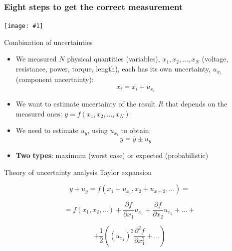 \documentclass[12pt]{beamer}
\newcommand{\fig}[1]{\centering\texttt{[image: \#1]}}
\begin{document}
% 

\begin{frame}
\frametitle{Eight steps to get the correct measurement}

\fig{8steps}

\end{frame}
%
%
%


%
\begin{frame}{Combination of uncertainties}
\begin{itemize}
\item We measured $N$ physical quantities (variables), $x_{1},x_{2},\ldots,x_{N}$
(voltage, resistance, power, torque, length), each has its own uncertainty,
$u_{x_{i}}$ (component uncertainty): 
\[
x_{i}=\overline{x_{i}}+u_{x_{i}}
\]
\item We want to estimate uncertainty of the result $R$ that depends on
the measured ones: $y=f(x_{1},x_{2},\ldots,x_{N})$. 
\item We need to estimate $u_{y}$, using $u_{x_{i}}$ to obtain:
\[
y=\overline{y}\pm u_{y}
\]
\item \textbf{Two} \textbf{types}: \alert{maximum} (worst case) or \alert{expected}
(probabilistic)
\end{itemize}
\end{frame}

%
\begin{frame}{Theory of uncertainty analysis }
{\large  Taylor expansion}

\[
y + u_y = f(x_1 + u_{x_1}, x_2 + u_{x+2}, ... )  = 
\]

\[
= f(x_1, x_2 , ...) + \frac{\partial f}{\partial x_1} u_{x_1} +  \frac{\partial f}{\partial x_2} u_{x_2} + ...  + 
\]


\[
+ \frac{1}{2} \left( (u_{x_1} )^2 \frac{\partial^2 f}{\partial x_1^2} +  ...   \right)
\]

\end{frame}
\end{document}

